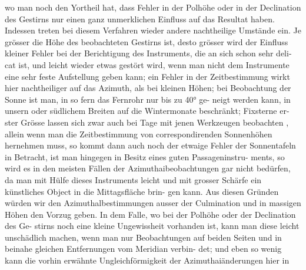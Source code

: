 \documentclass[12pt,a4paper]{article}
\begin{document}
wo man noch den Yortheil hat, dass Fehler in der Polhöhe oder in der Declination des Gestirns nur\newline
einen ganz unmerklichen Einfluss auf das Resultat haben. Indessen treten bei diesem Verfahren wieder\newline
andere nachtheilige Umstände ein. Je grösser die Höhe des beobachteten Gestirns ist, desto grösser\newline
wird der Einfluss kleiner Fehler bei der Berichtigung des Instruments, die an sich schon sehr deli-\newline
cat ist, und leicht wieder etwas gestört wird, wenn man nicht dem Instrumente eine sehr feste\newline
Aufstellung geben kann; ein Fehler in der Zeitbestimmung wirkt hier nachtheiliger auf das Azimuth,\newline
als bei kleinen Höhen; bei Beobachtung der Sonne ist man, in so fern das Fernrohr nur bis zu 40° ge-\newline
neigt werden kann, in unsern oder südlichem Breiten auf die Wintermonate beschränkt; Fixsterne er-\newline
ster Grösse lassen sich zwar auch bei Tage mit jenen Werkzeugen beobachten , allein wenn man die\newline
Zeitbestimmung von correspondirenden Sonnenhöhen hernehmen muss, so kommt dann auch noch der\newline
etwaige Fehler der Sonnentafeln in Betracht, ist man hingegen in Besitz eines guten Passageninstru-\newline
ments, so wird es in den meisten Fällen der Azimuthaibeobachtungen gar nicht bedürfen, da man mit\newline
Hülfe dieses Instruments leicht und mit grosser Schärfe ein künstliches Object in die Mittagsfläche brin-\newline
gen kann. Aus diesen Gründen würden wir den Azimuthalbestimmungen ausser der Culmination und\newline
in massigen Höhen den Vorzug geben. In dem Falle, wo bei der Polhöhe oder der Declination des Ge-\newline
stirns noch eine kleine Ungewissheit vorhanden ist, kann man diese leicht unschädlich machen, wenn\newline
man nur Beobachtungen auf beiden Seiten und in beinahe gleichen Entfernungen vom Meridian verbin-\newline
det; und eben so wenig kann die vorhin erwähnte Ungleichförmigkeit der Azimuthaiänderungen hier in\newline
\end{document}
